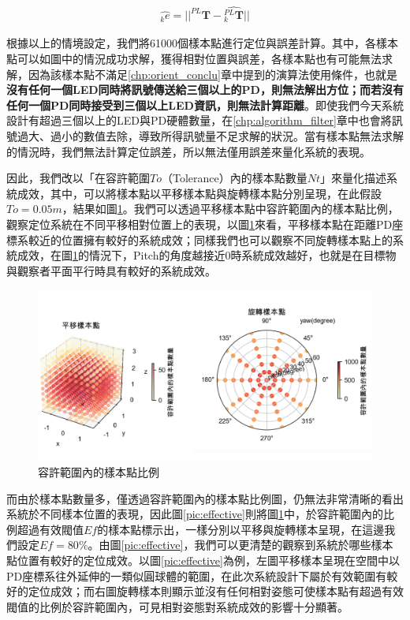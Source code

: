 \begin{gather}
    \label{eqn:sample_error}
    \hat{_k e} = ||^{PL}\boldsymbol{T}-\hat{^{PL}_k\boldsymbol{T}}||
\end{gather}



根據以上的情境設定，我們將61000個樣本點進行定位與誤差計算。其中，各樣本點可以如圖中的情況成功求解，獲得相對位置與誤差，各樣本點也有可能無法求解，因為該樣本點不滿足\ref{chp:orient_conclu}章中提到的演算法使用條件，也就是\textbf{沒有任何一個LED同時將訊號傳送給三個以上的PD，則無法解出方位；而若沒有任何一個PD同時接受到三個以上LED資訊，則無法計算距離}。即使我們今天系統設計有超過三個以上的LED與PD硬體數量，在\ref{chp:algorithm_filter}章中也會將訊號過大、過小的數值去除，導致所得訊號量不足求解的狀況。當有樣本點無法求解的情況時，我們無法計算定位誤差，所以無法僅用誤差來量化系統的表現。



因此，我們改以「在容許範圍$To$（Tolerance）內的樣本點數量$Nt$」來量化描述系統成效，其中，可以將樣本點以平移樣本點與旋轉樣本點分別呈現，在此假設$To=0.05m$，結果如圖\ref{pic:sample_out}。我們可以透過平移樣本點中容許範圍內的樣本點比例，觀察定位系統在不同平移相對位置上的表現，以圖\ref{pic:sample_out}來看，平移樣本點在距離PD座標系較近的位置擁有較好的系統成效；同樣我們也可以觀察不同旋轉樣本點上的系統成效，在圖\ref{pic:sample_out}的情況下，Pitch的角度越接近0時系統成效越好，也就是在目標物與觀察者平面平行時具有較好的系統成效。

\begin{figure}[htpb]
    \centering
    \includegraphics[width=14cm]{ch4pic/sample_out.png}
    \caption{容許範圍內的樣本點比例}
    \label{pic:sample_out}
\end{figure}

而由於樣本點數量多，僅透過容許範圍內的樣本點比例圖，仍無法非常清晰的看出系統於不同樣本位置的表現，因此圖\ref{pic:effective}則將圖\ref{pic:sample_out}中，於容許範圍內的比例超過有效閥值$Ef$的樣本點標示出，一樣分別以平移與旋轉樣本呈現，在這邊我們設定$Ef=80\%$。由圖\ref{pic:effective}，我們可以更清楚的觀察到系統於哪些樣本點位置有較好的定位成效。以圖\ref{pic:effective}為例，左圖平移樣本呈現在空間中以PD座標系往外延伸的一類似圓球體的範圍，在此次系統設計下屬於有效範圍有較好的定位成效；而右圖旋轉樣本則顯示並沒有任何相對姿態可使樣本點有超過有效閥值的比例於容許範圍內，可見相對姿態對系統成效的影響十分顯著。

